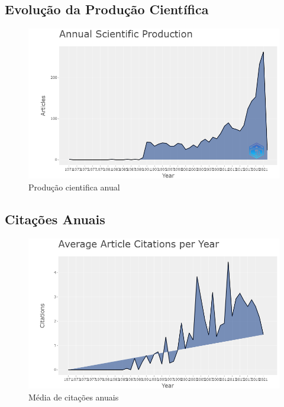 \subsection{Evolução da Produção Científica}

\begin{figure}[ht]
    \centering
    \includegraphics[width=12cm]{experiments/GMalme/AnaliseBibliometrica/ImpactoDeJogosNaTecnologia/Figs/Annual Scientific Production.png}
    \caption{Produção cientifica anual}
    \label{fig:AIJ_produçãoAnual}
\end{figure}

\subsection{Citações Anuais}

\begin{figure}[ht]
    \centering
    \includegraphics[width=12cm]{experiments/GMalme/AnaliseBibliometrica/ImpactoDeJogosNaTecnologia/Figs/Average Citations per Year.png}
    \caption{Média de citações anuais}
    \label{fig:AIJ_mediaCitacao}
\end{figure}


